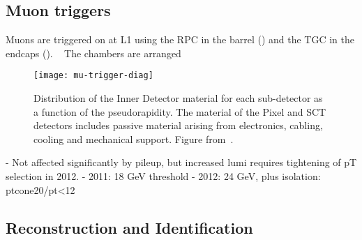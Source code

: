 \subsection{Muon triggers}
\label{sec:reco-mu-triggers}

Muons are triggered on at L1 using the RPC in the barrel () and
the TGC in the endcaps (). ~ The chambers are arranged



\begin{figure}[h]
\centering
            \texttt{[image: mu-trigger-diag]}
\caption{
Distribution of the Inner Detector material for each sub-detector as a
function of the pseudorapidity. The material of the Pixel and SCT detectors
includes passive material arising from electronics, cabling, cooling and
mechanical support. Figure from~\cite{2012EPJC...72.1849A}.}
\label{fig:mu-trigger-diag}
\end{figure}

- Not affected significantly by pileup, but increased lumi requires tightening of pT selection in 2012.
   - 2011: 18 GeV threshold
   - 2012: 24 GeV, plus isolation: ptcone20/pt<12%
   


\subsection{Reconstruction and Identification}
\label{sec:reco-el-reco}
